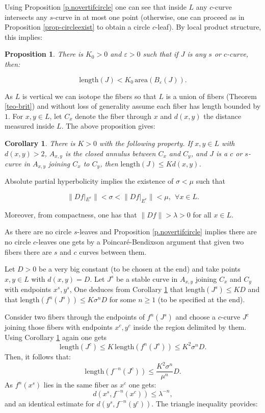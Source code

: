 \documentclass[11pt]{amsart} %
\newcommand{\Es}{E^s}
\newcommand{\Ec}{E^c}
\newcommand{\eps}{\varepsilon}
\numberwithin{equation}{section}
\newtheorem{cor}[equation]{Corollary}
\newtheorem{prop}[equation]{Proposition}
\theoremstyle{remark}
\begin{document}
Using Proposition \ref{p.novertifcircle} one can see that inside $L$ any $c$-curve intersects any $s$-curve in at most one point (otherwise, one can proceed as in Proposition \ref{prop-circleexist} to obtain a circle $c$-leaf). By local product structure, this implies:

\begin{prop}\label{prop-vollengthcs}
There is $K_0>0$ and $\eps>0$ such that if $J$ is any $s$ or $c$-curve, then:

$$ \mathrm{length}(J) < K_0 \, \mathrm{area}(B_\eps(J)). $$
\end{prop}

As $L$ is vertical we can isotope the fibers so that $L$ is a union of fibers (Theorem \ref{teo-brit}) and without loss of generality assume each fiber has length bounded by $1$. For $x,y \in L$, let $C_x$ denote the fiber through $x$ and $d(x,y)$ the distance measured inside $L$. The above proposition gives:

\begin{cor}\label{cor-vollen}
There is $K>0$ with the following property. If $x,y \in L$ with $d(x,y)>2$, $A_{x,y}$ is the closed annulus between $C_x$ and $C_y$, and $J$ is a $c$ or $s$-curve in $A_{x,y}$ joining $C_x$ to $C_y$, then $\mathrm{length}(J) \leq K d(x,y)$. 
\end{cor}

Absolute partial hyperbolicity implies the existence of $\sigma<\mu$ such that 

$$ \|Df|_{\Es}\| < \sigma< \|Df|_{\Ec}\| <\mu, \  \ \forall x \in L. $$

Moreover, from compactness, one has that $\|Df\| > \lambda>0$ for all $x\in L$. 

As there are no circle $s$-leaves and Proposition \ref{p.novertifcircle} implies there are no circle $c$-leaves one gets by a Poincar\'e-Bendixson argument that given two fibers there are $s$ and $c$ curves between them. 

Let $D>0$ be a very big constant (to be chosen at the end) and take points $x,y \in L$ with $d(x,y)=D$. Let $J^s$ be a stable curve in $A_{x,y}$ joining $C_x$ and $C_y$ with endpoints $x^s,y^s$, One deduces from Corollary \ref{cor-vollen} that $\mathrm{length}(J^s)  \leq KD$ and that $\mathrm{length}(f^n(J^s)) \leq K\sigma^n D$ for some $n\geq 1$ (to be specified at the end). 

Consider two fibers through the endpoints of $f^n(J^s)$ and choose a $c$-curve $J^c$ joining those fibers with endpoints $x^c,y^c$ inside the region delimited by them. Using Corollary \ref{cor-vollen} again one gets 
\[
 \mathrm{length}(J^c) \leq K \, \mathrm{length}(f^n(J^s)) \leq K^2 \sigma^n D. 
\]
Then, it follows that:
\[
 \mathrm{length}(f^{-n}(J^c)) \leq \frac{K^2 \sigma^n}{\mu^n} D. 
\]
As $f^n(x^s)$ lies in the same fiber as $x^c$ one gets:
\[
 d(x^s , f^{-n}(x^c)) \leq \lambda^{-n}, 
\]
\noindent and an identical estimate for $d(y^s,f^{-n}(y^c))$. The triangle inequality provides: 
\end{document}
